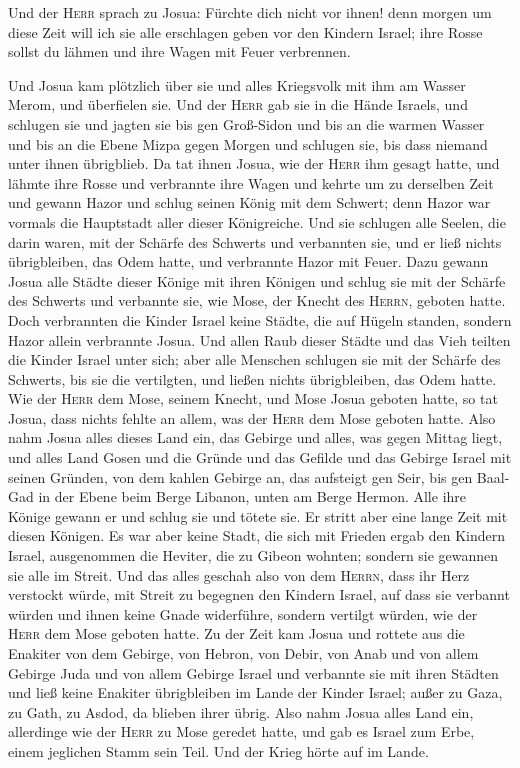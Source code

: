  Und der \textsc{Herr} sprach zu Josua: Fürchte dich nicht
vor ihnen! denn morgen um diese Zeit will ich sie alle erschlagen geben
vor den Kindern Israel; ihre Rosse sollst du lähmen und ihre Wagen mit
Feuer verbrennen.

 Und Josua kam plötzlich über sie und alles Kriegsvolk mit
ihm am Wasser Merom, und überfielen sie.  Und der
\textsc{Herr} gab sie in die Hände Israels, und schlugen sie und jagten
sie bis gen Groß-Sidon und bis an die warmen Wasser und bis an die Ebene
Mizpa gegen Morgen und schlugen sie, bis dass niemand unter ihnen
übrigblieb.  Da tat ihnen Josua, wie der \textsc{Herr} ihm
gesagt hatte, und lähmte ihre Rosse und verbrannte ihre Wagen
 und kehrte um zu derselben Zeit und gewann Hazor und
schlug seinen König mit dem Schwert; denn Hazor war vormals die
Hauptstadt aller dieser Königreiche.  Und sie schlugen
alle Seelen, die darin waren, mit der Schärfe des Schwerts und
verbannten sie, und er ließ nichts übrigbleiben, das Odem hatte, und
verbrannte Hazor mit Feuer.  Dazu gewann Josua alle
Städte dieser Könige mit ihren Königen und schlug sie mit der Schärfe
des Schwerts und verbannte sie, wie Mose, der Knecht des \textsc{Herrn},
geboten hatte.  Doch verbrannten die Kinder Israel keine
Städte, die auf Hügeln standen, sondern Hazor allein verbrannte Josua.
 Und allen Raub dieser Städte und das Vieh teilten die
Kinder Israel unter sich; aber alle Menschen schlugen sie mit der
Schärfe des Schwerts, bis sie die vertilgten, und ließen nichts
übrigbleiben, das Odem hatte.  Wie der \textsc{Herr} dem
Mose, seinem Knecht, und Mose Josua geboten hatte, so tat Josua, dass
nichts fehlte an allem, was der \textsc{Herr} dem Mose geboten hatte.
 Also nahm Josua alles dieses Land ein, das Gebirge und
alles, was gegen Mittag liegt, und alles Land Gosen und die Gründe und
das Gefilde und das Gebirge Israel mit seinen Gründen, 
von dem kahlen Gebirge an, das aufsteigt gen Seir, bis gen Baal-Gad in
der Ebene beim Berge Libanon, unten am Berge Hermon. Alle ihre Könige
gewann er und schlug sie und tötete sie.  Er stritt aber
eine lange Zeit mit diesen Königen.  Es war aber keine
Stadt, die sich mit Frieden ergab den Kindern Israel, ausgenommen die
Heviter, die zu Gibeon wohnten; sondern sie gewannen sie alle im Streit.
 Und das alles geschah also von dem \textsc{Herrn}, dass
ihr Herz verstockt würde, mit Streit zu begegnen den Kindern Israel, auf
dass sie verbannt würden und ihnen keine Gnade widerführe, sondern
vertilgt würden, wie der \textsc{Herr} dem Mose geboten hatte.
 Zu der Zeit kam Josua und rottete aus die Enakiter von
dem Gebirge, von Hebron, von Debir, von Anab und von allem Gebirge Juda
und von allem Gebirge Israel und verbannte sie mit ihren Städten
 und ließ keine Enakiter übrigbleiben im Lande der Kinder
Israel; außer zu Gaza, zu Gath, zu Asdod, da blieben ihrer übrig.
 Also nahm Josua alles Land ein, allerdinge wie der
\textsc{Herr} zu Mose geredet hatte, und gab es Israel zum Erbe, einem
jeglichen Stamm sein Teil. Und der Krieg hörte auf im Lande.

